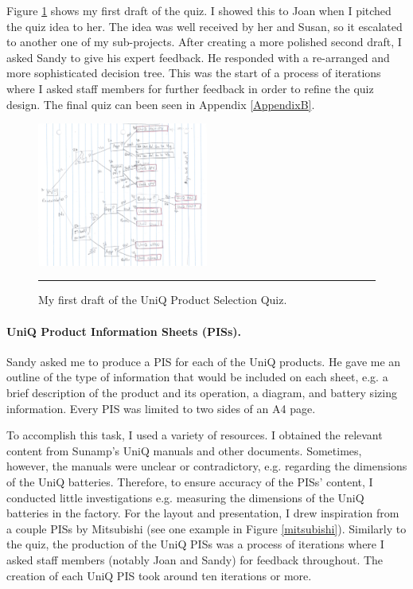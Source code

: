 Figure \ref{quiz_draft} shows my first draft of the quiz.
I showed this to Joan when I pitched the quiz idea to her.
The idea was well received by her and Susan, so it escalated to another one of my sub-projects.
After creating a more polished second draft, I asked Sandy to give his expert feedback.
He responded with a re-arranged and more sophisticated decision tree.
This was the start of a process of iterations where I asked staff members for further feedback in order to refine the quiz design.
The final quiz can been seen in Appendix \ref{AppendixB}.


\begin{figure}[htbp]
	\centering
	\includegraphics[width=0.5\textwidth]{figures/QuizSketch.png}
	\rule{\textwidth}{0.5pt} %
	\caption{My first draft of the UniQ Product Selection Quiz.}
	\label{quiz_draft}
\end{figure}



\paragraph{UniQ Product Information Sheets (PISs).} \label{sec:piss}

Sandy asked me to produce a PIS for each of the UniQ products.
He gave me an outline of the type of information that would be included on each sheet, e.g. a brief description of the product and its operation, a diagram, and battery sizing information.
Every PIS was limited to two sides of an A4 page.

To accomplish this task, I used a variety of resources.
I obtained the relevant content from Sunamp's UniQ manuals and other documents.
Sometimes, however, the manuals were unclear or contradictory, e.g. regarding the dimensions of the UniQ batteries.
Therefore, to ensure accuracy of the PISs' content, I conducted little investigations e.g. measuring the dimensions of the UniQ batteries in the factory.
For the layout and presentation, I drew inspiration from a couple PISs by Mitsubishi (see one example in Figure \ref{mitsubishi}).
Similarly to the quiz, the production of the UniQ PISs was a process of iterations where I asked staff members (notably Joan and Sandy) for feedback throughout.
The creation of each UniQ PIS took around ten iterations or more.


